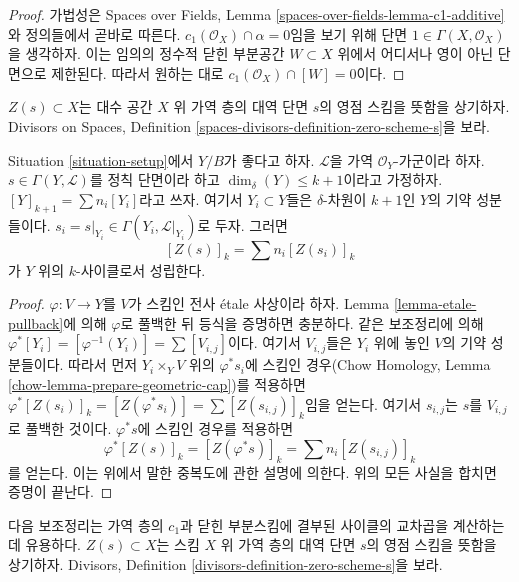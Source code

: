 \begin{proof}
가법성은 Spaces over Fields, Lemma
\ref{spaces-over-fields-lemma-c1-additive}와 정의들에서 곧바로 따른다.
$c_1(\mathcal{O}_X) \cap \alpha = 0$임을 보기 위해 단면
$1 \in \Gamma(X, \mathcal{O}_X)$을 생각하자. 이는 임의의 정수적 닫힌
부분공간 $W \subset X$ 위에서 어디서나 영이 아닌 단면으로 제한된다.
따라서 원하는 대로 $c_1(\mathcal{O}_X) \cap [W] = 0$이다.
\end{proof}

\noindent
$Z(s) \subset X$는 대수 공간 $X$ 위 가역 층의 대역 단면 $s$의
영점 스킴을 뜻함을 상기하자. Divisors on Spaces, Definition
\ref{spaces-divisors-definition-zero-scheme-s}을 보라.

\begin{lemma}
\label{lemma-prepare-geometric-cap}
Situation \ref{situation-setup}에서 $Y/B$가 좋다고 하자.
$\mathcal{L}$을 가역 $\mathcal{O}_Y$-가군이라 하자.
$s \in \Gamma(Y, \mathcal{L})$를 정칙 단면이라 하고
$\dim_\delta(Y) \leq k + 1$이라고 가정하자.
$[Y]_{k + 1} = \sum n_i[Y_i]$라고 쓰자. 여기서 $Y_i \subset Y$들은
$\delta$-차원이 $k + 1$인 $Y$의 기약 성분들이다.
$s_i = s|_{Y_i} \in \Gamma(Y_i, \mathcal{L}|_{Y_i})$로 두자. 그러면
\begin{equation}
\label{equation-equal-as-cycles}
[Z(s)]_k =  \sum n_i[Z(s_i)]_k
\end{equation}
가 $Y$ 위의 $k$-사이클로서 성립한다.
\end{lemma}

\begin{proof}
$\varphi : V \to Y$를 $V$가 스킴인 전사 \'etale 사상이라 하자.
Lemma \ref{lemma-etale-pullback}에 의해 $\varphi$로 풀백한 뒤 등식을
증명하면 충분하다. 같은 보조정리에 의해
$\varphi^*[Y_i] = [\varphi^{-1}(Y_i)] = \sum [V_{i, j}]$이다. 여기서
$V_{i, j}$들은 $Y_i$ 위에 놓인 $V$의 기약 성분들이다. 따라서 먼저
$Y_i \times_Y V$ 위의 $\varphi^*s_i$에 스킴인 경우(Chow Homology,
Lemma \ref{chow-lemma-prepare-geometric-cap})를 적용하면
$\varphi^*[Z(s_i)]_k = [Z(\varphi^*s_i)] =
\sum [Z(s_{i, j})]_k$임을 얻는다. 여기서 $s_{i, j}$는 $s$를
$V_{i, j}$로 풀백한 것이다. $\varphi^*s$에 스킴인 경우를 적용하면
$$
\varphi^*[Z(s)]_k =
[Z(\varphi^*s)]_k =
\sum n_i[Z(s_{i, j})]_k
$$
를 얻는다. 이는 위에서 말한 중복도에 관한 설명에 의한다.
위의 모든 사실을 합치면 증명이 끝난다.
\end{proof}

\noindent
다음 보조정리는 가역 층의 $c_1$과 닫힌 부분스킴에 결부된 사이클의
교차곱을 계산하는 데 유용하다. $Z(s) \subset X$는 스킴 $X$ 위 가역
층의 대역 단면 $s$의 영점 스킴을 뜻함을 상기하자. Divisors,
Definition \ref{divisors-definition-zero-scheme-s}을 보라.

